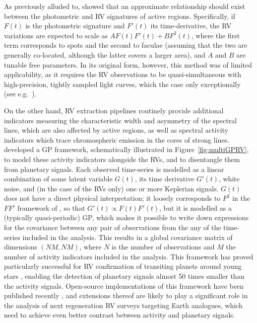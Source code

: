 \documentclass[letterpaper]{ar-1col}
\begin{document}
As previously alluded to, \citet{2012MNRAS.419.3147A} showed that an approximate relationship should exist between the photometric and RV signatures of active regions. Specifically, if $F(t)$ is the photometric signature and $F'(t)$ its time-derivative, the RV variations are expected to scale as $A F(t) F'(t) + B F^2(t)$, where the first term corresponds to spots and the second to faculae (assuming that the two are generally co-located, although the latter covers a larger area), and $A$ and $B$ are tunable free parameters. In its original form, however, this method was of limited applicability, as it requires the RV observations to be quasi-simultaneous with high-precision, tightly sampled light curves, which the case only exceptionally (see e.g.\ \citealt{2014MNRAS.445.3401G}).

On the other hand, RV extraction pipelines routinely provide additional indicators measuring the characteristic width and asymmetry of the spectral lines, which are also affected by active regions, as well as spectral activity indicators which trace chromospheric emission in the cores of strong lines. \citet{2015MNRAS.452.2269R} developed a GP framework, schematically illustrated in Figure~\ref{fig:multiGPRV}, to model these activity indicators alongside the RVs, and to disentangle them from planetary signals. Each observed time-series is modelled as a linear combination of some latent variable $G(t)$, its time derivative $G'(t)$, white noise, and (in the case of the RVs only) one or more Keplerian signals. $G(t)$ does not have a direct physical interpretation; it loosely corresponds to $F^2$ in the $FF'$ framework of \citet{2012MNRAS.419.3147A}, so that $G'(t) \propto F(t) F'(t)$, but it is modelled as a (typically quasi-periodic) GP, which makes it possible to write down expressions for the covariance between any pair of observations from the any of the time-series included in the analysis. This results in a global covariance matrix of dimensions $(NM,NM)$, where $N$ is the number of observations and $M$ the number of activity indicators included in the analysis. This framework has proved particularly successful for RV confirmation of transiting planets around young stars \citep{2019MNRAS.490..698B,2022MNRAS.512.3060Z}, enabling the detection of planetary signals almost 50 times smaller than the activity signals.  Open-source implementations of this framework have been published recently \citep{2022MNRAS.509..866B,2022A&A...659A.182D}, and extensions thereof are likely to play a significant role in the analysis of next regeneration RV surveys targeting Earth analogues, which need to achieve even better contrast between activity and planetary signals.
\end{document}
